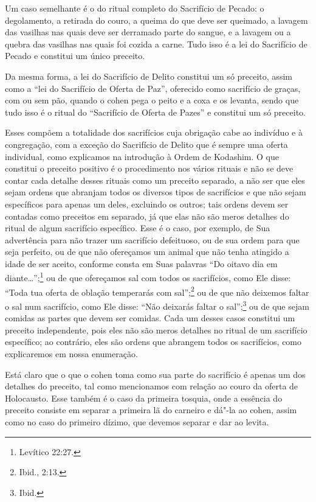 Um caso semelhante é o do ritual completo do Sacrifício de Pecado:
o degolamento, a retirada do couro, a queima do que deve ser queimado, a
lavagem das vasilhas nas quais deve ser derramado parte do sangue, e a
lavagem ou a quebra das vasilhas nas quais foi cozida a carne. Tudo
isso é a lei do Sacrifício de Pecado e constitui um único preceito.

Da mesma forma, a lei do Sacrifício de Delito constitui um só preceito,
assim como a ``lei do Sacrifício de Oferta de Paz'', oferecido como
sacrifício de graças, com ou sem pão, quando o cohen\starr{} pega o peito e
a coxa e os levanta, sendo que tudo isso é o ritual do ``Sacrifício de
Oferta de Pazes'' e
constitui um só preceito.

Esses compõem a totalidade dos sacrifícios cuja obrigação cabe ao
indivíduo e à congregação, com a exceção do Sacrifício de Delito que é
sempre uma oferta individual, como explicamos na introdução à Ordem de
Kodashim\starr.
O que constitui o preceito positivo é o procedimento nos vários rituais
e não se deve contar cada detalhe desses rituais como um preceito
separado, a não
ser que eles sejam ordens que abranjam todos os diversos tipos de
sacrifícios e que não sejam específicos para apenas um deles, excluindo
os outros; tais ordens devem ser contadas como preceitos em separado,
já que elas não são meros detalhes do ritual de algum sacrifício
específico. Esse é o caso, por exemplo, de Sua advertência para não
trazer um sacrifício defeituoso, ou de sua ordem para que seja
perfeito, ou de que não ofereçamos um animal que não tenha atingido a
idade de ser aceito, conforme consta em Suas palavras ``Do oitavo dia
em diante\ldots{}'';\footnote{Levítico 22:27.} ou de que ofereçamos sal com todos os
sacrifícios, como Ele disse: ``Toda tua oferta de oblação temperarás com
sal'';\footnote{Ibid., 2:13.} ou de que não deixemos faltar o sal num sacrifício,
como Ele disse: ``Não deixarás faltar o sal'';\footnote{Ibid.} ou de que sejam
comidas as partes que devem ser comidas. Cada um desses casos constitui
um preceito independente, pois eles não são meros detalhes no ritual de
um sacrifício específico; ao contrário, eles são ordens que abrangem
todos os sacrifícios, como explicaremos em nossa enumeração.

Está claro que o que o cohen\starr{} toma como sua parte do sacrifício é
apenas um dos detalhes do preceito, tal como mencionamos com relação ao
couro da oferta de Holocausto. Esse também é o caso da primeira tosquia,
onde a essência do preceito consiste em separar a primeira lã do
carneiro e dá"-la ao cohen\starr, assim como no caso do primeiro dízimo,
que devemos separar e dar ao levita\starr.

